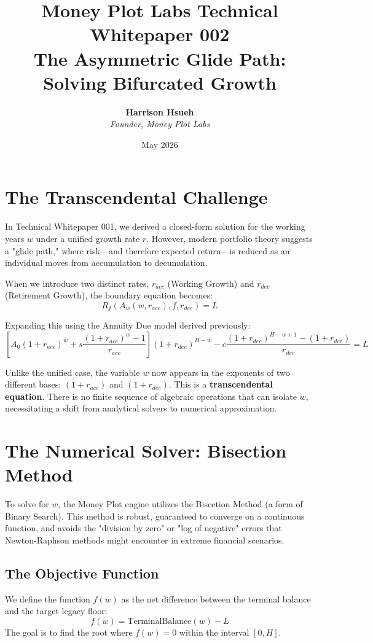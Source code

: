 \documentclass[11pt,letterpaper]{article}
\title{\vspace{-20pt}\textbf{\color{mpdark}Money Plot Labs Technical Whitepaper 002 \\ The Asymmetric Glide Path: Solving Bifurcated Growth}}
\author{\textbf{Harrison Hsueh} \\ \textit{Founder, Money Plot Labs}}
\date{May 2026}
\begin{document}
\maketitle

\section{The Transcendental Challenge}
In Technical Whitepaper 001, we derived a closed-form solution for the working years $w$ under a unified growth rate $r$. However, modern portfolio theory suggests a "glide path," where risk—and therefore expected return—is reduced as an individual moves from accumulation to decumulation. 

When we introduce two distinct rates, $r_{acc}$ (Working Growth) and $r_{dec}$ (Retirement Growth), the boundary equation becomes:
\begin{equation}
    R_f(A_w(w, r_{acc}), f, r_{dec}) = L
\end{equation}

Expanding this using the Annuity Due model derived previously:
\begin{equation}
    \left[ A_0(1+r_{acc})^w + s \frac{(1+r_{acc})^w - 1}{r_{acc}} \right] (1+r_{dec})^{H-w} - c \frac{(1+r_{dec})^{H-w+1} - (1+r_{dec})}{r_{dec}} = L
\end{equation}

Unlike the unified case, the variable $w$ now appears in the exponents of two different bases: $(1+r_{acc})$ and $(1+r_{dec})$. This is a \textbf{transcendental equation}. There is no finite sequence of algebraic operations that can isolate $w$, necessitating a shift from analytical solvers to numerical approximation.

\section{The Numerical Solver: Bisection Method}
To solve for $w$, the Money Plot engine utilizes the Bisection Method (a form of Binary Search). This method is robust, guaranteed to converge on a continuous function, and avoids the "division by zero" or "log of negative" errors that Newton-Raphson methods might encounter in extreme financial scenarios.

\subsection{The Objective Function}
We define the function $f(w)$ as the net difference between the terminal balance and the target legacy floor:
\begin{equation}
    f(w) = \text{TerminalBalance}(w) - L
\end{equation}
The goal is to find the root where $f(w) = 0$ within the interval $[0, H]$.
\end{document}
